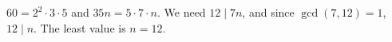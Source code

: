 $60=2^2\cdot3\cdot5$ and $35n=5\cdot7\cdot n$. We need $12\mid7n$, and since $\gcd(7,12)=1$, $12\mid n$. The least value is $n=\boxed{12}$.
